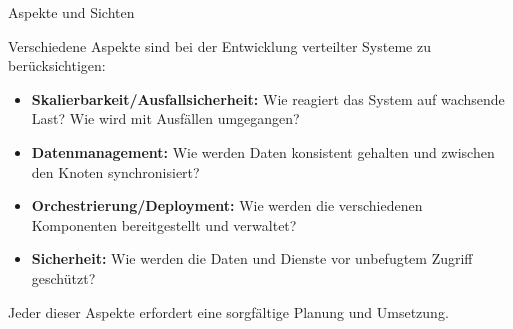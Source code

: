 \documentclass{beamer}
\begin{document}
\begin{frame}{Aspekte und Sichten}

    Verschiedene Aspekte sind bei der Entwicklung verteilter Systeme zu berücksichtigen:

    \begin{itemize}
        \item \textbf{Skalierbarkeit/Ausfallsicherheit:}  Wie reagiert das System auf wachsende Last? Wie wird mit Ausfällen umgegangen?
        \item \textbf{Datenmanagement:} Wie werden Daten konsistent gehalten und zwischen den Knoten synchronisiert?
        \item \textbf{Orchestrierung/Deployment:} Wie werden die verschiedenen Komponenten bereitgestellt und verwaltet?
        \item \textbf{Sicherheit:} Wie werden die Daten und Dienste vor unbefugtem Zugriff geschützt?
    \end{itemize}

    Jeder dieser Aspekte erfordert eine sorgfältige Planung und Umsetzung.

\end{frame}
\end{document}
